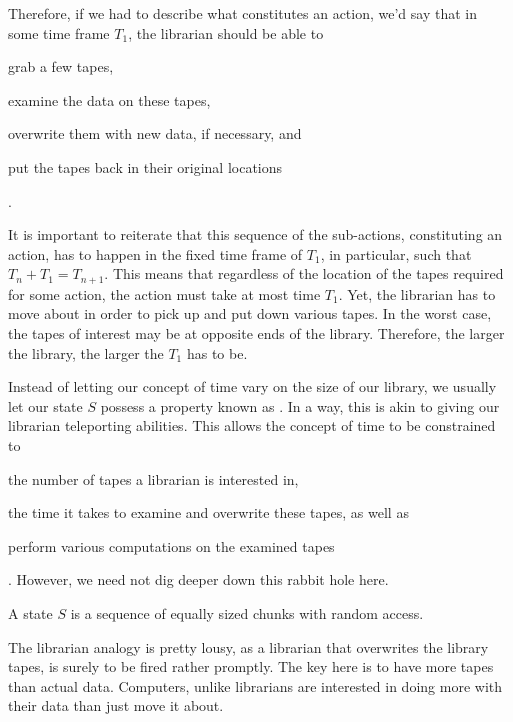 

Therefore, if we had to describe what constitutes an action, we'd say that in
some time frame $T_1$, the librarian should be able to \begin{inparaenum}[(1)]
\item grab a few tapes, \item examine the data on these tapes, \item overwrite
them with new data, if necessary, and \item put the tapes back in their
original locations\end{inparaenum}.

It is important to reiterate that this sequence of the sub-actions,
constituting an action, has to happen in the fixed time frame of $T_1$, in
particular, such that $T_n+T_1=T_{n+1}$.  This means that regardless of the
location of the tapes required for some action, the action must take at most
time $T_1$. Yet, the librarian has to move about in order to pick up and put
down various tapes. In the worst case, the tapes of interest may be at opposite
ends of the library. Therefore, the larger the library, the larger the $T_1$
has to be. 

Instead of letting our concept of time vary on the size of our library, we
usually let our state $S$ possess a property known as . In a
way, this is akin to giving our librarian teleporting abilities. This allows
the concept of time to be constrained to \begin{inparaenum}[(1)] \item the
number of tapes a librarian is interested in, \item the time it takes to
examine and overwrite these tapes, as well as \item perform various
computations on the examined tapes\end{inparaenum}. However, we need not dig
deeper down this rabbit hole here.

\begin{definition}

A state $S$ is a sequence of equally sized chunks with random access.

\end{definition}

The librarian analogy is pretty lousy, as a librarian that overwrites the
library tapes, is surely to be fired rather promptly. The key here is to have
more tapes than actual data. Computers, unlike librarians are interested in
doing more with their data than just move it about.

